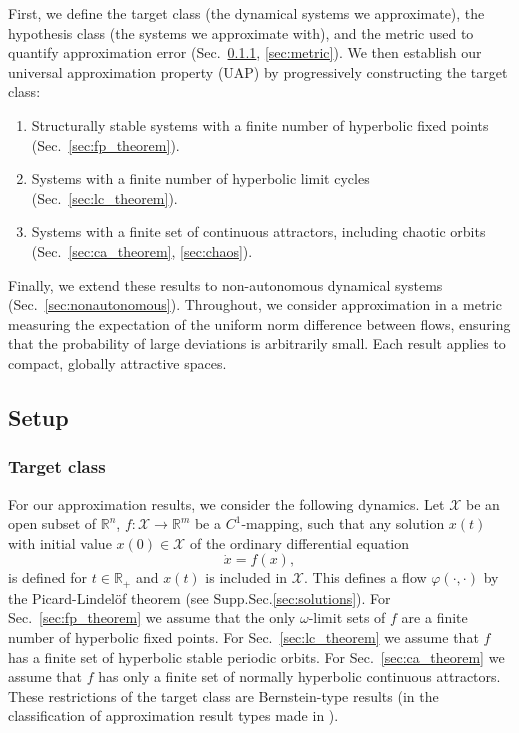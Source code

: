 \documentclass{article}
\newcommand{\reals}{\mathbb{R}}
\newcounter{ct}
\begin{document}
First, we define the target class (the dynamical systems we approximate), the hypothesis class (the systems we approximate with), and the metric used to quantify approximation error (Sec.~\ref{sec:target}, \ref{sec:metric}). We then establish our universal approximation property (UAP) by progressively constructing the target class:
\begin{enumerate}
\item Structurally stable systems with a finite number of hyperbolic fixed points (Sec.~\ref{sec:fp_theorem}).
\item Systems with a finite number of hyperbolic limit cycles (Sec.~\ref{sec:lc_theorem}).
\item Systems with a finite set of continuous attractors, including chaotic orbits (Sec.~\ref{sec:ca_theorem}, \ref{sec:chaos}).
\end{enumerate}
Finally, we extend these results to non-autonomous dynamical systems (Sec.~\ref{sec:nonautonomous}). Throughout, we consider approximation in a metric measuring the expectation of the uniform norm difference between flows, ensuring that the probability of large deviations is arbitrarily small. Each result applies to compact, globally attractive spaces.


\subsection{Setup}
\subsubsection{Target class}\label{sec:target}
For our approximation results, we consider the following dynamics.
Let $\mathcal{X}$ be an open subset of $\mathbb{R}^n$,
 $f\colon \mathcal{X} \to \mathbb{R}^m$ be a $C^1$-mapping,
 such that any solution $x(t)$ with initial value $x(0) \in \mathcal{X}$ of the ordinary differential equation %
\begin{equation}\label{eq:mlp_vf}
    \dot{x} = f(x),
\end{equation}
is defined for $t\in\reals_{+}$ and $x(t)$ is included in $\mathcal{X}$. %
This defines a flow $\varphi(\cdot, \cdot)$ by the Picard-Lindel\"of theorem (see Supp.Sec.\ref{sec:solutions}).
For Sec.~\ref{sec:fp_theorem} we assume that the only $\omega$-limit sets of  $f$ are a finite number of hyperbolic fixed points.
For Sec.~\ref{sec:lc_theorem} we assume that $f$ has a finite set of hyperbolic stable periodic orbits.
For Sec.~\ref{sec:ca_theorem} we assume that $f$ has only a finite set of normally hyperbolic continuous attractors.
%
These restrictions of the target class are Bernstein-type results (in the classification of approximation result types made in  \citep{jiang2023brief}).
\end{document}
